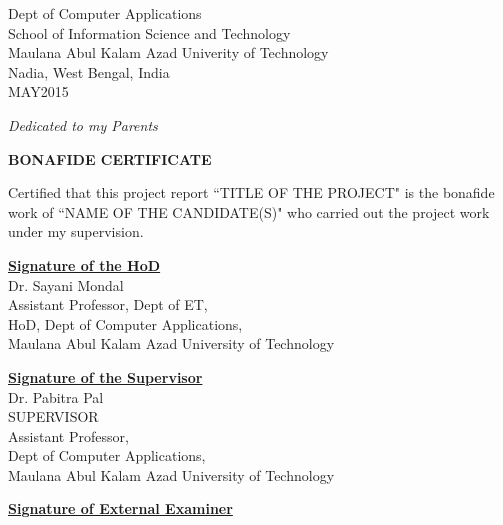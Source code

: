 \documentclass[12pt]{report}
\begin{document}
\begin{titlepage}
\begin{center}
Dept of Computer Applications\\
School of Information Science and Technology\\
Maulana Abul Kalam Azad Univerity of Technology\\
Nadia, West Bengal, India\\
    
       {MAY}{\hspace*{0.5cm}}{2015}
        
    \end{center}
\end{titlepage}
\newpage


\begin{center}
\vspace*{8.5cm}
\LARGE
\textit{Dedicated to my Parents}

\end{center}

\newpage


 \begin{center}
        \vspace*{1cm}
         \LARGE
        \textbf{BONAFIDE CERTIFICATE}
        
        \vspace{1.5cm}
 \justify    
 {\fontsize{14pt}{12pt}\selectfont 	
 Certified that this project report ``TITLE OF THE PROJECT" is the bonafide work of ``NAME OF THE CANDIDATE(S)" who carried out the project work under my supervision.}\\  
	        
        
        \vspace{2.5cm}
 \normalsize    
 \begin{minipage}{3in}
 	\textbf{\underline{Signature of the HoD}} \\
 	Dr. Sayani Mondal\\
 	Assistant Professor, Dept of ET,\\ 
 	HoD, Dept of Computer Applications,\\
 	Maulana Abul Kalam Azad University of Technology
 \end{minipage}
 \hfill
 \begin{minipage}{2.5in}
 	\textbf{\underline{Signature of the Supervisor}} \\
 	Dr. Pabitra Pal\\
 	SUPERVISOR\\
 	Assistant Professor,\\
 	Dept of Computer Applications,\\
 	 	Maulana Abul Kalam Azad University of Technology
 \end{minipage}
        
     \vspace{2.5cm}    
  \begin{minipage}{3in}
  	\textbf{\underline{Signature of External Examiner}} \\
  	
  \end{minipage}     
        
        
    \end{center}
\end{document}
